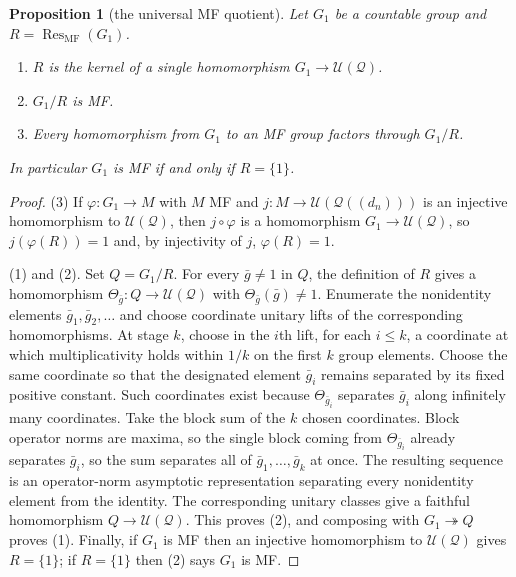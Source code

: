 \documentclass[11pt]{amsart}
\newcommand{\leanverified}[2]{\ignorespaces}
\newtheorem{proposition}[theorem]{Proposition}
\theoremstyle{definition}
\theoremstyle{remark}
\theoremstyle{plain}
\newcommand{\U}{\mathcal U}
\begin{document}
\begin{proposition}[the universal MF quotient]\label{prop:univquot}
Let $G_1$ be a countable group and
$R=\operatorname{Res}_{\mathrm{MF}}(G_1)$.
\begin{enumerate}
\item $R$ is the kernel of a single homomorphism $G_1\to\U(\mathcal Q)$.
\item $G_1/R$ is MF\@.
\item Every homomorphism from $G_1$ to an MF group factors through
$G_1/R$.
\end{enumerate}
In particular $G_1$ is MF if and only if $R=\{1\}$.
\leanverified{Sofic/ManuscriptExactWrappers}{GroupApproximation.ManuscriptExactWrappers.manuscriptUniversalMFQuotient}
\end{proposition}

\begin{proof}
(3) If $\varphi\colon G_1\to M$ with $M$ MF and
$j\colon M\to\U(\mathcal Q((d_n)))$ is an injective homomorphism to $\U(\mathcal Q)$,
then $j\circ\varphi$ is a homomorphism $G_1\to\U(\mathcal Q)$, so
$j(\varphi(R))=1$ and, by injectivity of $j$, $\varphi(R)=1$.

(1) and (2).  Set $Q=G_1/R$.  For every $\bar g\ne1$ in $Q$, the
definition of $R$ gives a homomorphism
$\Theta_{\bar g}\colon Q\to\U(\mathcal Q)$ with
$\Theta_{\bar g}(\bar g)\ne1$.  Enumerate the nonidentity elements
$\bar g_1,\bar g_2,\dots$ and choose coordinate unitary lifts of the
corresponding homomorphisms.  At stage $k$, choose in the $i$th lift,
for each $i\le k$, a coordinate at which multiplicativity holds within
$1/k$ on the first $k$ group elements.  Choose the same coordinate so
that the designated element $\bar g_i$ remains separated by its fixed
positive constant.  Such coordinates exist because
$\Theta_{\bar g_i}$ separates $\bar g_i$ along infinitely many
coordinates.  Take the block sum of
the $k$ chosen coordinates.  Block operator norms are maxima, so the
single block coming from $\Theta_{\bar g_i}$ already separates
$\bar g_i$, so the sum separates all of
$\bar g_1,\dots,\bar g_k$ at once.  The resulting sequence is an
operator-norm asymptotic representation separating every nonidentity
element from the identity.  The corresponding unitary classes give a
faithful homomorphism $Q\to\U(\mathcal Q)$.  This proves (2), and composing with
$G_1\twoheadrightarrow Q$ proves (1).  Finally, if $G_1$ is MF then an
injective homomorphism to $\U(\mathcal Q)$ gives $R=\{1\}$; if $R=\{1\}$ then
(2) says $G_1$ is MF\@.
\end{proof}
\end{document}
